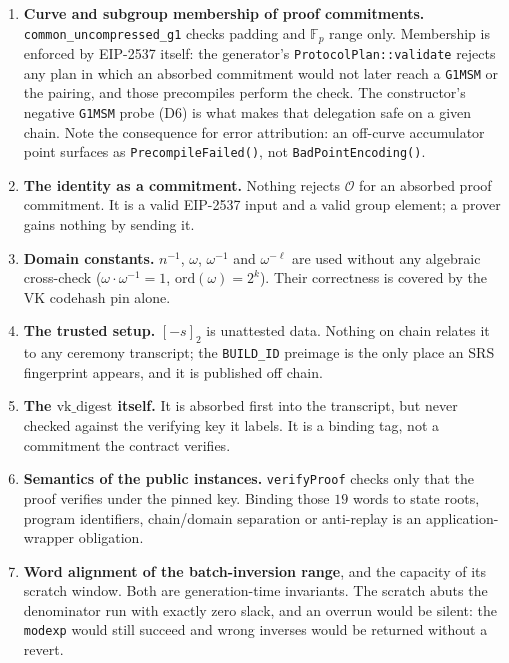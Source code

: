 \documentclass[11pt,a4paper]{article}
\newcommand{\Fp}{\ensuremath{\mathbb{F}_{p}}}
\newcommand{\Ident}{\ensuremath{\mathcal{O}}}
\newcommand{\code}[1]{\texttt{#1}}
\newcommand{\err}[1]{\textcolor{red!60!black}{\texttt{#1}}}
\theoremstyle{definition}
\begin{document}
\begin{enumerate}[label=\textbf{N\arabic*.},leftmargin=1.4cm]

\item \textbf{Curve and subgroup membership of proof commitments.}
\code{common\_uncompressed\_g1} checks padding and $\Fp$ range only. Membership
is enforced by EIP-2537 itself: the generator's \code{ProtocolPlan::validate}
rejects any plan in which an absorbed commitment would not later reach a
\code{G1MSM} or the pairing, and those precompiles perform the check. The
constructor's negative \code{G1MSM} probe (D6) is what makes that delegation
safe on a given chain. Note the consequence for error attribution: an
off-curve accumulator point surfaces as \err{PrecompileFailed()}, not
\err{BadPointEncoding()}.

\item \textbf{The identity as a commitment.} Nothing rejects
$\Ident$ for an absorbed proof commitment. It is a valid EIP-2537 input and a
valid group element; a prover gains nothing by sending it.

\item \textbf{Domain constants.} $n^{-1}$, $\omega$, $\omega^{-1}$ and
$\omega^{-\ell}$ are used without any algebraic cross-check
($\omega\cdot\omega^{-1}=1$, $\mathrm{ord}(\omega)=2^{k}$). Their correctness
is covered by the VK codehash pin alone.

\item \textbf{The trusted setup.} $[-s]_2$ is unattested data. Nothing on chain
relates it to any ceremony transcript; the \code{BUILD\_ID} preimage is the
only place an SRS fingerprint appears, and it is published off chain.

\item \textbf{The $\mathrm{vk\_digest}$ itself.} It is absorbed first into the
transcript, but never checked against the verifying key it labels. It is a
binding tag, not a commitment the contract verifies.

\item \textbf{Semantics of the public instances.} \code{verifyProof} checks
only that the proof verifies under the pinned key. Binding those $19$ words to
state roots, program identifiers, chain/domain separation or anti-replay is an
application-wrapper obligation.

\item \textbf{Word alignment of the batch-inversion range}, and the capacity of
its scratch window. Both are generation-time invariants. The scratch abuts the
denominator run with exactly zero slack, and an overrun would be silent: the
\code{modexp} would still succeed and wrong inverses would be returned without
a revert.


\end{enumerate}
\end{document}
